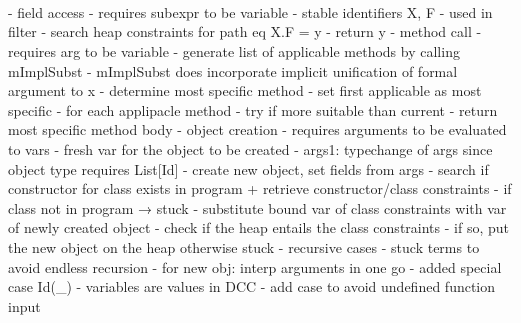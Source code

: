 \quad\\\\\\
- field access
  - requires subexpr to be variable
  - stable identifiers X, F
    - used in filter
    - search heap constraints for path eq X.F = y
    - return y
- method call
  - requires arg to be variable
  - generate list of applicable methods
    by calling mImplSubst
  - mImplSubst does incorporate implicit unification of formal argument to x
  - determine most specific method
    - set first applicable as most specific
    - for each applipacle method
      - try if more suitable than current
  - return most specific method body
- object creation
  - requires arguments to be evaluated to vars
  - fresh var for the object to be created
  - args1: typechange of args since object type requires List[Id]
  - create new object, set fields from args
  - search if constructor for class exists in program
    + retrieve constructor/class constraints
  - if class not in program → stuck
  - substitute bound var of class constraints
    with var of newly created object
  - check if the heap entails the class constraints
  - if so, put the new object on the heap
    otherwise stuck
- recursive cases
  - stuck terms to avoid endless recursion
  - for new obj: interp arguments in one go  
- added special case Id(_)
  - variables are values in DCC
  - add case to avoid undefined function input


